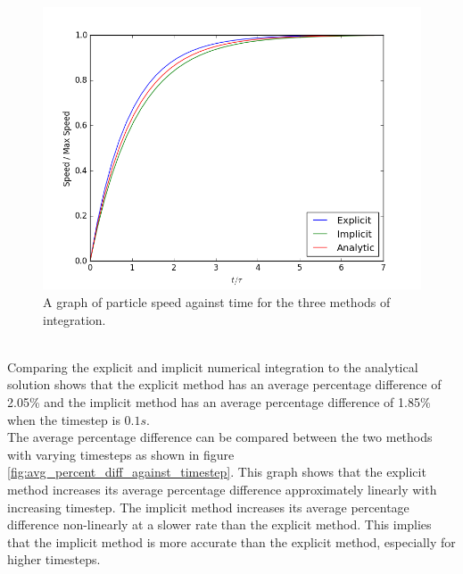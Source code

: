 \documentclass[10pt,a4paper,titlepage]{report}
\begin{document}
\begin{figure}[!ht]
\centering
\includegraphics[scale=0.75]{figures/ParticleSpeedWithVaryingIntegration.png}
\caption{A graph of particle speed against time for the three methods of integration.}
\label{fig:particle_speed_for_different_integrations}
\end{figure}
\\Comparing the explicit and implicit numerical integration to the analytical solution shows that the explicit method has an average percentage difference of 2.05\% and the implicit method has an average percentage difference of 1.85\% when the timestep is $0.1 s$.
\\The average percentage difference can be compared between the two methods with varying timesteps as shown in figure \ref{fig:avg_percent_diff_against_timestep}. This graph shows that the explicit method increases its average percentage difference approximately linearly with increasing timestep. The implicit method increases its average percentage difference non-linearly at a slower rate than the explicit method. This implies that the implicit method is more accurate than the explicit method, especially for higher timesteps.
\end{document}
